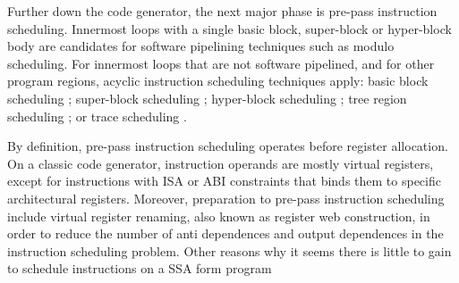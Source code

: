 Further down the code generator, the next major phase is pre-pass instruction
scheduling. Innermost loops with a single basic block, super-block or
hyper-block body are candidates for software pipelining techniques such as
modulo scheduling. For innermost loops that are not software pipelined, and for
other program regions, acyclic instruction scheduling techniques apply: basic
block scheduling \cite{Goodman:1988:ICS}; super-block scheduling
\cite{Hwu:1993:JS}; hyper-block scheduling \cite{Mahlke:1992:MICRO}; tree region
scheduling \cite{Havanki:1998:HPCA}; or trace scheduling \cite{Lowney:1992:JS}.

By definition, pre-pass instruction scheduling operates before register
allocation. On a classic code generator, instruction operands are mostly virtual
registers, except for instructions with ISA or ABI constraints that binds them
to specific architectural registers. Moreover, preparation to pre-pass
instruction scheduling include virtual register renaming, also known as register
web construction, in order to reduce the number of anti dependences and output
dependences in the instruction scheduling problem. Other reasons why it seems
there is little to gain to schedule instructions on a SSA form program
